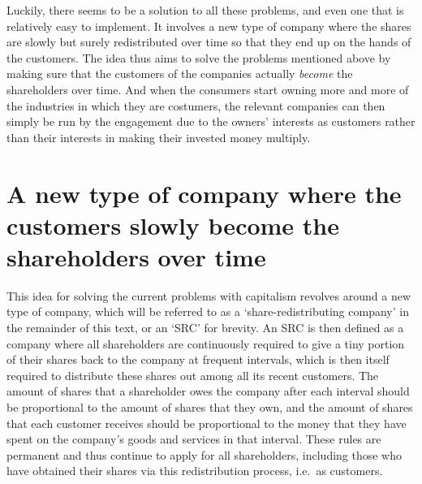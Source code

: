 \documentclass{article}
\begin{document}
Luckily, there seems to be a solution to all these problems, and even one that is relatively easy to implement. 
It involves a new type of company where the shares are slowly but surely redistributed over time so that they end up on the hands of the customers. 
The idea thus aims to solve the problems mentioned above 
by making sure that the customers of the companies actually \emph{become} the shareholders over time. %
And when the consumers start owning more and more of the industries in which they are costumers, the relevant companies can then simply be run by the engagement due to the owners' interests as customers rather than their interests in making their invested money multiply. 







\section[A new type of company]{A new type of company where the customers slowly become the shareholders over time}


This idea for solving the current problems with capitalism revolves around a new type of company, which will be referred to as a `share-redistributing company' in the remainder of this text, or an `SRC' for brevity.
An SRC is then defined as a company where all shareholders are continuously required to give a tiny portion of their shares back to the company at frequent intervals, which is then itself required to distribute these shares out among all its recent customers. The amount of shares that a shareholder owes the company after each interval should be proportional to the amount of shares that they own, and the amount of shares that each customer receives should be proportional to the money that they have spent on the company's goods and services in that interval. These rules are permanent and thus continue to apply for all shareholders, including those who have obtained their shares via this redistribution process, i.e.\ as customers.
\end{document}
